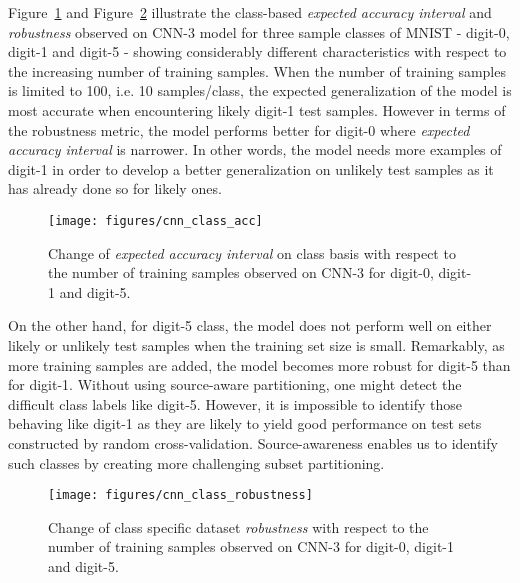 \documentclass[letterpaper]{article}
\begin{document}
Figure~\ref{fig:data_class_acc} and Figure~\ref{fig:data_class_robust} illustrate the class-based \textit{expected accuracy interval} and \textit{robustness} observed on CNN-3 model for three sample classes of MNIST - digit-0, digit-1 and digit-5 - showing considerably different characteristics with respect to the increasing number of training samples. When the number of training samples is limited to 100, i.e. 10 samples/class, the expected generalization of the model is most accurate when encountering likely digit-1 test samples.  However in terms of the robustness metric, the model performs better for digit-0 where \textit{expected accuracy interval} is narrower. In other words, the model needs more examples of digit-1 in order to develop a better generalization on unlikely test samples as it has already done so for likely ones. 
\begin{figure}[h]
	\begin{center}
		\centerline{\texttt{[image: figures/cnn\_class\_acc]}}
		\caption{Change of \textit{expected accuracy interval} on class basis with respect to the number of training samples observed on CNN-3 for digit-0, digit-1 and digit-5.}
		\label{fig:data_class_acc}
	\end{center}
	\vskip -0.3in
\end{figure}
On the other hand, for digit-5 class, the model does not perform well on either likely or unlikely test samples when the training set size is small. Remarkably, as more training samples are added, the model becomes more robust for digit-5 than for digit-1. Without using source-aware partitioning, one might detect the difficult class labels like digit-5. However, it is impossible to identify those behaving like digit-1 as they are likely to yield good performance on test sets constructed by random cross-validation. Source-awareness enables us to identify such classes by creating more challenging subset partitioning.    

\begin{figure}[t]
	\begin{center}
		\centerline{\texttt{[image: figures/cnn\_class\_robustness]}}
		\caption{Change of class specific dataset \textit{robustness} with respect to the number of training samples observed on CNN-3 for digit-0, digit-1 and digit-5.}
		\label{fig:data_class_robust}
	\end{center}
	\vskip -0.2in
\end{figure}
\end{document}
